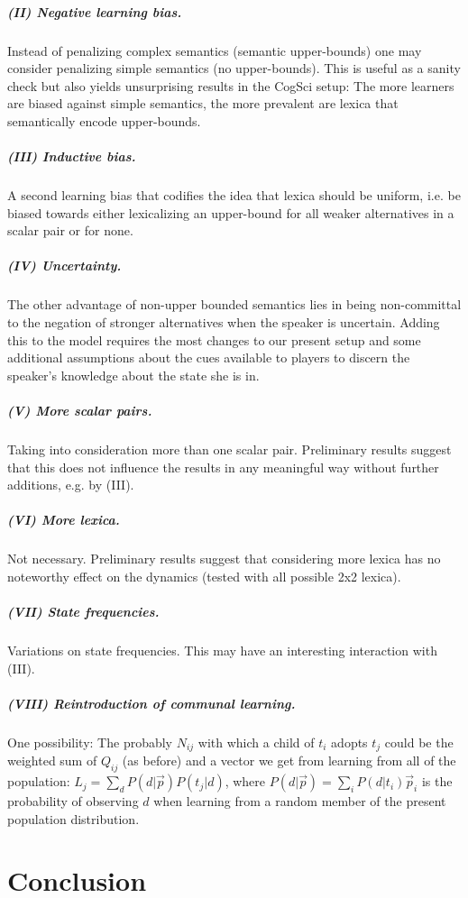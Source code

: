 \documentclass[a4paper]{article}
\begin{document}
\subparagraph{(II) Negative learning bias.} Instead of penalizing complex semantics (semantic upper-bounds) one may consider penalizing simple semantics (no upper-bounds). This is useful as a sanity check but also yields unsurprising results in the CogSci setup: The more learners are biased against simple semantics, the more prevalent are lexica that semantically encode upper-bounds. 

\subparagraph{(III) Inductive bias.} A second learning bias that codifies the idea that lexica should be uniform, i.e. be biased towards either lexicalizing an upper-bound for all weaker alternatives in a scalar pair or for none.

\subparagraph{(IV)  Uncertainty.} The other advantage of non-upper bounded semantics lies in being non-committal to the negation of stronger alternatives when the speaker is uncertain. Adding this to the model requires the most changes to our present setup and some additional assumptions about the cues available to players to discern the speaker's knowledge about the state she is in. 

\subparagraph{(V) More scalar pairs.} Taking into consideration more than one scalar pair. Preliminary results suggest that this does not influence the results in any meaningful way without further additions, e.g. by (III).

\subparagraph{(VI) More lexica.} Not necessary. Preliminary results suggest that considering more lexica has no noteworthy effect on the dynamics (tested with all possible 2x2 lexica).

\subparagraph{(VII) State frequencies.} Variations on state frequencies. This may have an interesting interaction with (III).

\subparagraph{(VIII) Reintroduction of communal learning.} One possibility: The probably $N_{ij}$ with which a child of $t_i$ adopts $t_j$ could be the weighted sum of $Q_{ij}$ (as before) and a vector we get from learning from all of the population: $L_j = \sum_d P(d | \vec{p})  P(t_j | d)$, where $P(d | \vec{p}) = \sum_{i} P(d | t_i)  \vec{p}_i$ is the probability of observing $d$ when learning from a random member of the present population distribution.

\section{Conclusion}
\end{document}

